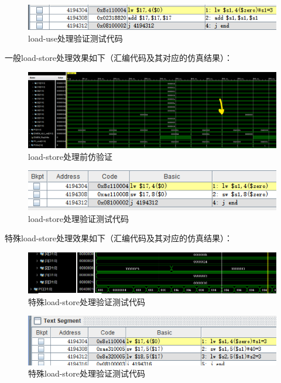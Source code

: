 \documentclass[10pt]{article}
\begin{document}
    \begin{figure}[H]
        \centering
        \includegraphics[scale=0.9]{addon.png}
        \caption{load-use处理验证测试代码}
        \end{figure}
一般load-store处理效果如下（汇编代码及其对应的仿真结果）：
\begin{figure}[H]
    \centering
    \includegraphics[scale=0.4]{lstore.png}
    \caption{load-store处理前仿验证}
    \end{figure}
    \begin{figure}[H]
        \centering
        \includegraphics[scale=0.9]{fo.png}
        \caption{load-store处理验证测试代码}
        \end{figure}
特殊load-store处理效果如下（汇编代码及其对应的仿真结果）：
\begin{figure}[H]
    \centering
    \includegraphics[scale=0.5]{specialls.png}
    \caption{特殊load-store处理验证测试代码}
    \end{figure}
\begin{figure}[H]
    \centering
    \includegraphics[scale=0.9]{hdl.png}
    \caption{特殊load-store处理验证测试代码}
    \end{figure}
\end{document}

